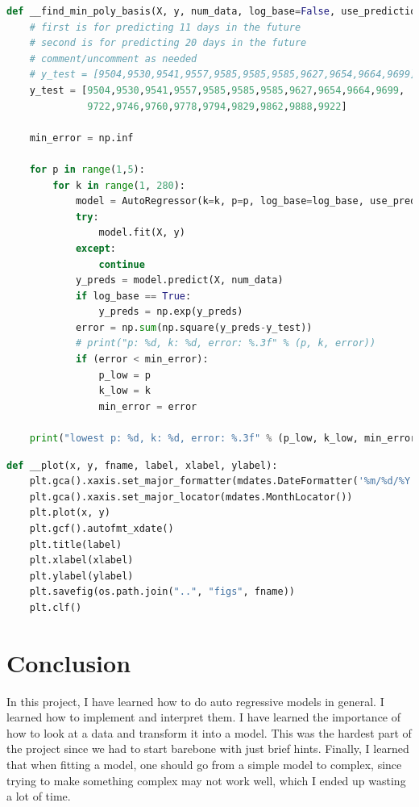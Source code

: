 \clearpage
\begin{lstlisting}[language=Python, caption=Brute force to search for k and p]
def __find_min_poly_basis(X, y, num_data, log_base=False, use_prediction=True):
    # first is for predicting 11 days in the future
    # second is for predicting 20 days in the future
    # comment/uncomment as needed 
    # y_test = [9504,9530,9541,9557,9585,9585,9585,9627,9654,9664,9699]
    y_test = [9504,9530,9541,9557,9585,9585,9585,9627,9654,9664,9699,
              9722,9746,9760,9778,9794,9829,9862,9888,9922]

    min_error = np.inf

    for p in range(1,5):
        for k in range(1, 280):
            model = AutoRegressor(k=k, p=p, log_base=log_base, use_prediction=use_prediction)
            try:
                model.fit(X, y)
            except:
                continue
            y_preds = model.predict(X, num_data)
            if log_base == True:
                y_preds = np.exp(y_preds)
            error = np.sum(np.square(y_preds-y_test))
            # print("p: %d, k: %d, error: %.3f" % (p, k, error))
            if (error < min_error):
                p_low = p
                k_low = k
                min_error = error
    
    print("lowest p: %d, k: %d, error: %.3f" % (p_low, k_low, min_error)) 
\end{lstlisting}

\begin{lstlisting}[language=Python, caption=Plotting function]
def __plot(x, y, fname, label, xlabel, ylabel):
    plt.gca().xaxis.set_major_formatter(mdates.DateFormatter('%m/%d/%Y'))
    plt.gca().xaxis.set_major_locator(mdates.MonthLocator())
    plt.plot(x, y)
    plt.gcf().autofmt_xdate()
    plt.title(label)
    plt.xlabel(xlabel)
    plt.ylabel(ylabel)
    plt.savefig(os.path.join("..", "figs", fname))
    plt.clf()
\end{lstlisting}

\section{Conclusion}
In this project, I have learned how to do auto regressive models in general. I learned how to implement and interpret them. I have learned the importance of how to look at a data and transform it into a model. This was the hardest part of the project since we had to start barebone with just brief hints. Finally, I learned that when fitting a model, one should go from a simple model to complex, since trying to make something complex may not work well, which I ended up wasting a lot of time.

